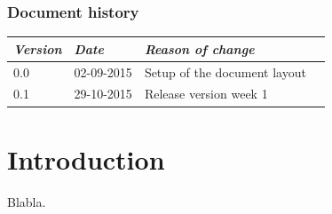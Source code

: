 \subsection*{Document history}
\begin{tabular}[!]{|l|l|l|l|}
    \hline
    \emph{Version}    &   \emph{Date} &  \emph{Reason of change}\\
    \hline
    0.0 & 02-09-2015 &  Setup of the document layout\\    
    \hline
    0.1 & 29-10-2015 & Release version week 1 \\
    \hline
\end{tabular}

\clearpage



\chapter{Introduction}
Blabla.

